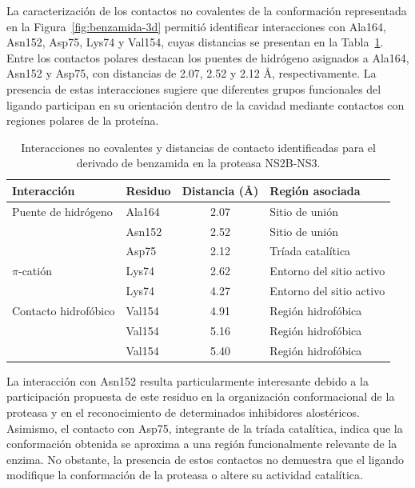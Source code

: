 La caracterización de los contactos no covalentes de la conformación representada en la Figura~\ref{fig:benzamida-3d} permitió identificar interacciones con Ala164, Asn152, Asp75, Lys74 y Val154, cuyas distancias se presentan en la Tabla~\ref{tab:interacciones-2fom}. Entre los contactos polares destacan los puentes de hidrógeno asignados a Ala164, Asn152 y Asp75, con distancias de 2.07, 2.52 y 2.12 \AA, respectivamente. La presencia de estas interacciones sugiere que diferentes grupos funcionales del ligando participan en su orientación dentro de la cavidad mediante contactos con regiones polares de la proteína.

\begin{table}[H]
    \centering
    \caption{Interacciones no covalentes y distancias de contacto identificadas para el derivado de benzamida en la proteasa NS2B-NS3.}
    \label{tab:interacciones-2fom}
    \footnotesize
    \renewcommand{\arraystretch}{1.15}
    \begin{tabular}{llcl}
        \toprule
        Interacción & Residuo & Distancia (\AA) & Región asociada \\
        \midrule
        Puente de hidrógeno & Ala164 & 2.07 & Sitio de unión \\
                            & Asn152 & 2.52 & Sitio de unión \\
                            & Asp75  & 2.12 & Tríada catalítica \\
        \midrule
        $\pi$-catión & Lys74 & 2.62 & Entorno del sitio activo \\
                     & Lys74 & 4.27 & Entorno del sitio activo \\
        \midrule
        Contacto hidrofóbico & Val154 & 4.91 & Región hidrofóbica \\
                            & Val154 & 5.16 & Región hidrofóbica \\
                            & Val154 & 5.40 & Región hidrofóbica \\
        \bottomrule
    \end{tabular}
\end{table}

La interacción con Asn152 resulta particularmente interesante debido a la participación propuesta de este residuo en la organización conformacional de la proteasa y en el reconocimiento de determinados inhibidores alostéricos. Asimismo, el contacto con Asp75, integrante de la tríada catalítica, indica que la conformación obtenida se aproxima a una región funcionalmente relevante de la enzima. No obstante, la presencia de estos contactos no demuestra que el ligando modifique la conformación de la proteasa o altere su actividad catalítica.

